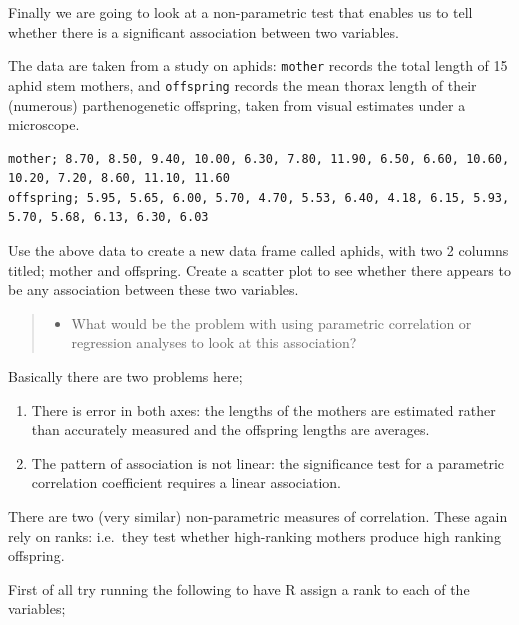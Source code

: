 \documentclass[
]{book}
\newenvironment{Shaded}{\begin{snugshade}}{\end{snugshade}}
\newcommand{\AttributeTok}[1]{\textcolor[rgb]{0.13,0.29,0.53}{#1}}
\newcommand{\FunctionTok}[1]{\textcolor[rgb]{0.13,0.29,0.53}{\textbf{#1}}}
\newcommand{\NormalTok}[1]{#1}
\newcommand{\OtherTok}[1]{\textcolor[rgb]{0.56,0.35,0.01}{#1}}
\newcommand{\SpecialCharTok}[1]{\textcolor[rgb]{0.81,0.36,0.00}{\textbf{#1}}}
\providecommand{\tightlist}{%
  \setlength{\itemsep}{0pt}\setlength{\parskip}{0pt}}
\begin{document}
Finally we are going to look at a non-parametric test that enables us to tell whether there is a significant association between two variables.

The data are taken from a study on aphids: \texttt{mother} records the total length of 15 aphid stem mothers, and \texttt{offspring} records the mean thorax length of their (numerous) parthenogenetic offspring, taken from visual estimates under a microscope.

\begin{verbatim}
mother; 8.70, 8.50, 9.40, 10.00, 6.30, 7.80, 11.90, 6.50, 6.60, 10.60, 10.20, 7.20, 8.60, 11.10, 11.60 
offspring; 5.95, 5.65, 6.00, 5.70, 4.70, 5.53, 6.40, 4.18, 6.15, 5.93, 5.70, 5.68, 6.13, 6.30, 6.03 
\end{verbatim}

Use the above data to create a new data frame called aphids, with two 2 columns titled; mother and offspring. Create a scatter plot to see whether there appears to be any association between these two variables.

\begin{quote}
\begin{itemize}
\tightlist
\item
  What would be the problem with using parametric correlation or regression analyses to look at this association?
\end{itemize}
\end{quote}

Basically there are two problems here;

\begin{enumerate}
\def\labelenumi{\arabic{enumi})}
\tightlist
\item
  There is error in both axes: the lengths of the mothers are estimated rather than accurately measured and the offspring lengths are averages.
\item
  The pattern of association is not linear: the significance test for a parametric correlation coefficient requires a linear association.
\end{enumerate}

There are two (very similar) non-parametric measures of correlation. These again rely on ranks: i.e.~they test whether high-ranking mothers produce high ranking offspring.

First of all try running the following to have R assign a rank to each of the variables;

\begin{Shaded}
\end{Shaded}
\end{document}
